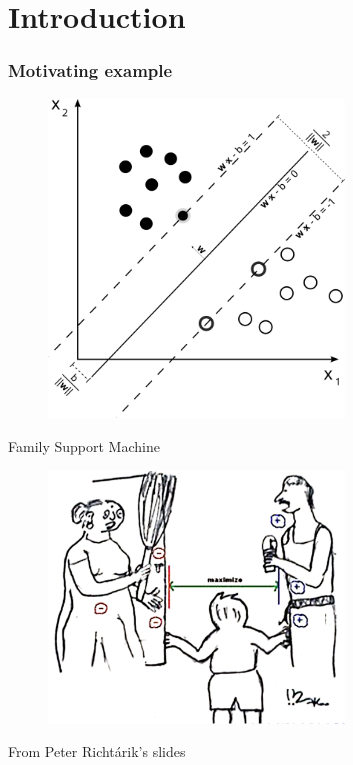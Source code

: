 \section{Introduction}
\begin{frame}[fragile]
    \frametitle{Motivating example}
    \begin{figure}[htbp]
        \centering
        \includegraphics[height=0.8\textheight, width=0.7\textwidth]{images/svm_ex.png}
    \end{figure}
\end{frame}

\begin{frame}{Family Support Machine}
    \begin{figure}[htbp]
        \centering
        \includegraphics[height=0.6\textheight, width=0.7\textwidth]{images/family.png}
    \end{figure}
    From Peter Richt\'arik's slides
\end{frame}

